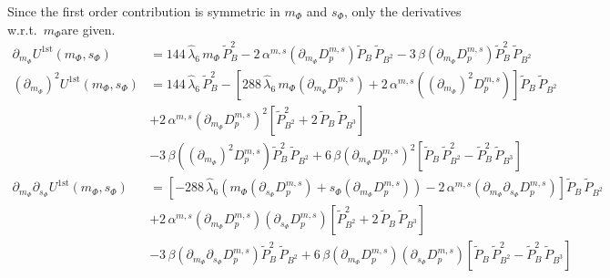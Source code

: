 Since the first order contribution is symmetric in $m_{\Phi}$ and $s_{\Phi}$, only the derivatives w.r.t.\ $m_{\Phi}$are given. 
\begin{align}\label{eq:CEP_derivative_dm_firstOrder}
 \partial_{m_{\Phi}} U^{\text{1st}}(m_{\Phi}, s_{\Phi}) & = 144\,\hat\lambda_6\, m_{\Phi}\, \tilde P_B^2 
                         - 2\,\alpha^{m,s}\left( \partial_{m_{\Phi}} D_p^{m,s} \right) \tilde P_B\, \tilde P_{B^2}
                         - 3\, \beta \left( \partial_{m_{\Phi}} D_p^{m,s} \right) \tilde P_B^2\,  \tilde P_{B^2}
       \\ \label{eq:CEP_derivative_dmdm_firstOrder}
 \left(\partial_{m_{\Phi}}\right)^2 U^{\text{1st}}(m_{\Phi}, s_{\Phi}) & = 144\,\hat\lambda_6\, \tilde P_B^2 -
                         \left[ 288\,\hat\lambda_6\,m_{\Phi}\left( \partial_{m_{\Phi}} D_p^{m,s} \right) 
                         + 2\,\alpha^{m,s}\left( \left(\partial_{m_{\Phi}}\right)^2 D_p^{m,s} \right) \right] \tilde P_B\, \tilde P_{B^2}
       \nonumber \\
                       & + 2\,\alpha^{m,s}\left( \partial_{m_{\Phi}} D_p^{m,s} \right)^2 \left[ \tilde P_{B^2}^2 + 2\, \tilde P_B\, \tilde P_{B^3} \right]
       \nonumber \\
                       & - 3\, \beta \left( \left(\partial_{m_{\Phi}}\right)^2 D_p^{m,s} \right) \tilde P_B^2\,  \tilde P_{B^2}
                         + 6\, \beta \left( \partial_{m_{\Phi}} D_p^{m,s} \right)^2 
                         \left[ \tilde P_B\,  \tilde P_{B^2}^2 - \tilde P_B^2\,  \tilde P_{B^3} \right]
      \\ \label{eq:CEP_derivative_dmds_firstOrder}
 \partial_{m_{\Phi}}\partial_{s_{\Phi}}U^{\text{1st}}(m_{\Phi}, s_{\Phi}) & =
                         \left[- 288\,\hat\lambda_6\left( m_{\Phi} \left( \partial_{s_{\Phi}} D_p^{m,s} \right) + s_{\Phi} \left( \partial_{m_{\Phi}} D_p^{m,s} \right) \right)
                         - 2\,\alpha^{m,s} \left( \partial_{m_{\Phi}} \partial_{s_{\Phi}} D_p^{m,s} \right) \right] \tilde P_B\, \tilde P_{B^2}
      \nonumber \\
                       & + 2\,\alpha^{m,s} \left( \partial_{m_{\Phi}} D_p^{m,s} \right)\left( \partial_{s_{\Phi}} D_p^{m,s} \right)
                         \left[ \tilde P_{B^2}^2 + 2\, \tilde P_B\, \tilde P_{B^3} \right]
      \nonumber \\
                       & - 3\, \beta \left( \partial_{m_{\Phi}}\partial_{s_{\Phi}} D_p^{m,s} \right) \tilde P_B^2\,  \tilde P_{B^2}
                         + 6\, \beta \left( \partial_{m_{\Phi}} D_p^{m,s} \right)\left( \partial_{s_{\Phi}} D_p^{m,s} \right)
                         \left[ \tilde P_B\,  \tilde P_{B^2}^2 - \tilde P_B^2\,  \tilde P_{B^3} \right]
\end{align}



